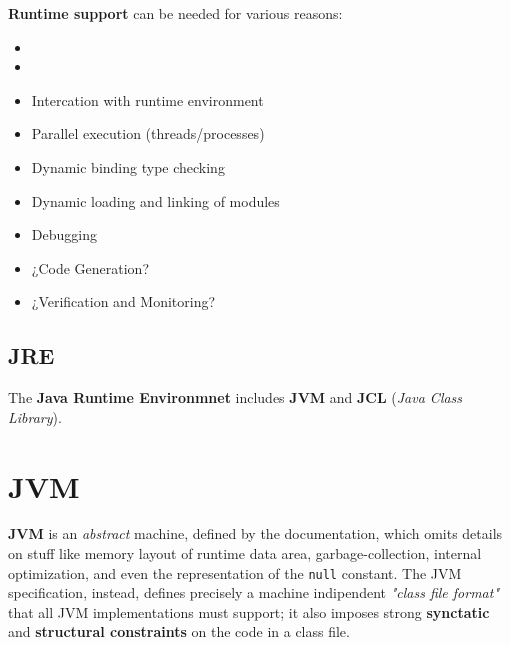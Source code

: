 \textbf{Runtime support} can be needed for various reasons:
\begin{itemize}
    \item %
    \item {}
    \item Intercation with runtime environment
    \item Parallel execution (threads/processes)
    \item Dynamic binding type checking
    \item Dynamic loading and linking of modules
    \item Debugging
    \item ¿Code Generation?
    \item ¿Verification and Monitoring?
\end{itemize}

\subsection{JRE}
The \textbf{Java Runtime Environmnet} includes \textbf{JVM} and \textbf{JCL} (\textit{Java Class Library}).

\section{JVM}
\textbf{JVM} is an \textit{abstract} machine, defined by the documentation,
which omits details on stuff like memory layout of runtime data area, garbage-collection, internal optimization, and even the representation of the \lstinline{null} constant.
The JVM specification, instead, defines precisely a machine indipendent \textit{"class file format"} that all JVM implementations must support;
it also imposes strong \textbf{synctatic} and \textbf{structural constraints} on the code in a class file.
\nl

